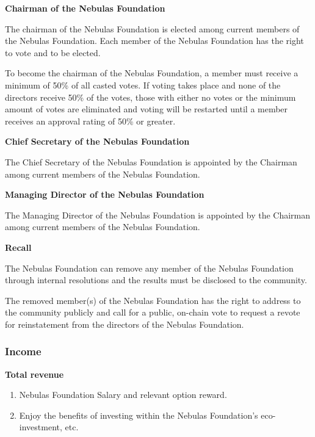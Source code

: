 \vspace{2em}

\textbf{Chairman of the Nebulas Foundation}

The chairman of the Nebulas Foundation is elected among current members of the Nebulas Foundation. Each member of the Nebulas Foundation has the right to vote and to be elected.

To become the chairman of the Nebulas Foundation, a member must receive a minimum of 50\% of all casted votes. If voting takes place and none of the directors receive 50\% of the votes, those with either no votes or the minimum amount of votes are eliminated and voting will be restarted until a member receives an approval rating of 50\% or greater.

\vspace{2em}

\textbf{Chief Secretary of the Nebulas Foundation}

The Chief Secretary of the Nebulas Foundation is appointed by the Chairman among current members of the Nebulas Foundation.

\vspace{2em}

\textbf{Managing Director of the Nebulas Foundation}

The Managing Director of the Nebulas Foundation is appointed by the Chairman among current members of the Nebulas Foundation.

\vspace{2em}

\textbf{Recall}

The Nebulas Foundation can remove any member of the Nebulas Foundation through internal resolutions and the results must be disclosed to the community.

The removed member(s) of the Nebulas Foundation has the right to address to the community publicly and call for a public, on-chain vote to request a revote for reinstatement from the directors of the Nebulas Foundation.

\subsubsection{Income}

\textbf{Total revenue}

\begin{enumerate}
	\item Nebulas Foundation Salary and relevant option reward.
    \item Enjoy the benefits of investing within the Nebulas Foundation’s eco-investment, etc.
\end{enumerate}

